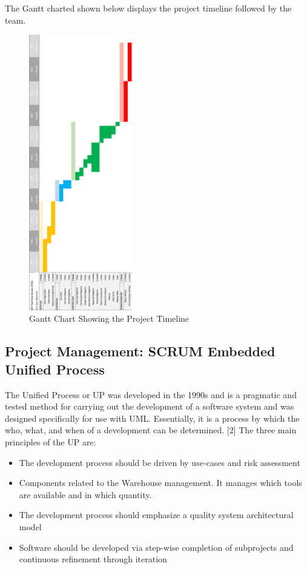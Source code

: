 \documentclass[fontsize=11pt]{extarticle}
\numberwithin{figure}{section} %
\numberwithin{table}{section}%
\begin{document}
The Gantt charted shown below displays the project timeline followed by
the team.

\begin{figure}[H]
      \centering
      \includegraphics[trim = 0 0 0 0, clip, width=0.4\textwidth]{TempImg/gant.png}
      \caption{Gantt Chart Showing the Project Timeline}
 \end{figure}

\hypertarget{project-management-scrum-embedded-unified-process}{%
\subsection{Project Management: SCRUM Embedded Unified
Process}\label{project-management-scrum-embedded-unified-process}}

The Unified Process or UP was developed in the 1990s and is a pragmatic
and tested method for carrying out the development of a software system
and was designed specifically for use with UML. Essentially, it is a
process by which the who, what, and when of a development can be
determined. {[}2{]} The three main principles of the UP are:

\begin{itemize}
  \item The development process should be driven by use-cases and risk assessment
  \item Components related to the Warehouse management. It manages which tools are available and in which quantity.
  \item The development process should emphasize a quality system architectural model 
  \item Software should be developed via step-wise completion of subprojects and continuous refinement through iteration
\end{itemize}
\end{document}
